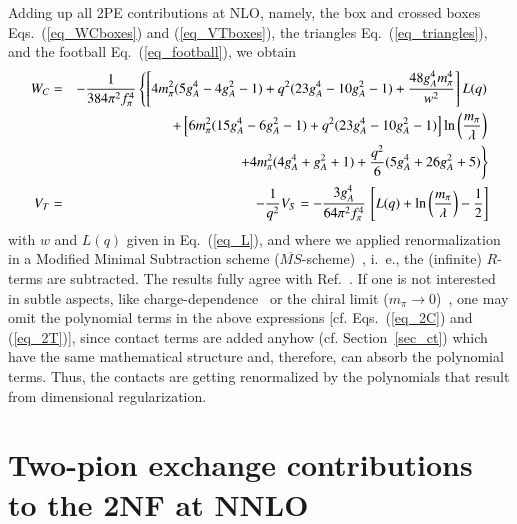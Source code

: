 \documentclass[sort&compress,preprint,3p]{elsarticle}
\begin{document}
Adding up all 2PE contributions at NLO, namely, the box and crossed boxes
Eqs.~(\ref{eq_WCboxes}) and (\ref{eq_VTboxes}), 
the triangles Eq.~(\ref{eq_triangles}), and the football Eq.~(\ref{eq_football}),
we obtain
\begin{eqnarray} 
W_C &=&-{1\over384\pi^2 f_\pi^4} 
\left\{
\left[ 4m_\pi^2(5g_A^4-4g_A^2-1)
+q^2(23g_A^4 -10g_A^2-1) 
+ {48g_A^4 m_\pi^4 \over w^2} \right] L(q)
\right. \nonumber \\ && \left.
+ \left[ 6m_\pi^2(15g_A^4 - 6g_A^2 -1) + q^2(23g_A^4 - 10 g_A^2 -1) \right]
\ln\left(\frac{m_\pi}{\lambda}\right)
\right. \nonumber \\ && \left.
+ 4m_\pi^2(4g_A^4 + g_A^2 +1) + \frac{q^2}{6}(5g_A^4 + 26 g_A^2 +5)
\right\}
\\   
V_T &=& -{1\over q^2} V_{S} =
-\frac{3g_A^4}{64 \pi^2f_\pi^4} \,
\left[ L(q) +\ln \left(\frac{m_\pi}{\lambda}\right) 
-\frac{1}{2} \right]
\end{eqnarray}  
with $w$ and $L(q)$ given in Eq.~(\ref{eq_L}), and
where we applied renormalization in a 
Modified Minimal Subtraction scheme 
($\overline{MS}$-scheme)~\cite{Col84},
i.~e., the (infinite) $R$-terms are subtracted. 
The results fully agree with Ref.~\cite{KBW97}.
If one is not interested in subtle aspects, like charge-dependence~\cite{WME01} or 
the chiral limit ($m_\pi \rightarrow 0$)~\cite{EMG03},
one may omit
the polynomial terms in the above expressions [cf. Eqs.~(\ref{eq_2C}) and (\ref{eq_2T})],
since contact terms are added anyhow (cf. Section~\ref{sec_ct}) 
which have the same mathematical structure and, therefore,
can absorb the polynomial terms.
Thus, the contacts are getting renormalized by
the polynomials that result from dimensional regularization.



\section{Two-pion exchange contributions to the 2NF at NNLO
\label{app_NNLO}}

\setcounter{figure}{0}
\setcounter{table}{0}
\end{document}
